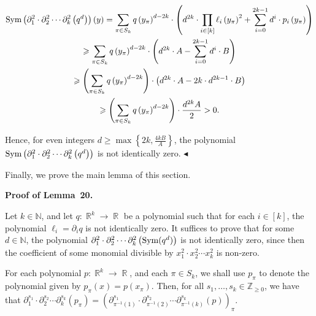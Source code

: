 \documentclass[10pt,a4paper]{article}
\begin{document}
\[\begin{gathered}
\displaystyle\textnormal{Sym}\left(\partial_{1}^{2}\cdot\partial_{2}^{2}\cdots\partial_{k}^{2}\left(q^{d}\right)\right)(y) \displaystyle=\sum_{\pi\in S_{k}}q\left(y_{\pi}\right)^{d-2k}\cdot\left(d^{2k}\cdot\prod_{i\in[k]}\ell_{i}\left(y_{\pi}\right)^{2}+\sum_{i=0}^{2k-1}d^{i}\cdot p_{i}\left(y_{\pi}\right)\right) \\
\displaystyle\geqslant\sum_{\pi\in S_{k}}q\left(y_{\pi}\right)^{d-2k}\cdot\left(d^{2k}\cdot A-\sum_{i=0}^{2k-1}d^{i}\cdot B\right) \\
\displaystyle\geqslant\left(\sum_{\pi\in S_{k}}q\left(y_{\pi}\right)^{d-2k}\right)\cdot\left(d^{2k}\cdot A-2k\cdot d^{2k-1}\cdot B\right) \\
\displaystyle\geqslant\left(\sum_{\pi\in S_{k}}q\left(y_{\pi}\right)^{d-2k}\right)\cdot\frac{d^{2k}A}{2}>0.
\end{gathered}\]


Hence, for even integers $d\geqslant\max\left\{2k,\frac{4kB}{A}\right\}$, the polynomial $\textnormal{Sym}\left(\partial_{1}^{2}\cdot\partial_{2}^{2}\cdots\partial_{k}^{2}\left(q^{d}\right)\right)$ is not identically zero.
$\blacktriangleleft$\par




Finally, we prove the main lemma of this section.\par





\par\medskip\noindent\textbf{Proof of Lemma 20.}\par




Let $k\in\mathbb{N}$, and let $q:\mathop{\mathbb{R}}^{k}\to\mathop{\mathbb{R}}$ be a polynomial such that for each $i\in[k]$, the polynomial $\ell_{i}=\partial_{i}q$ is not identically zero.
It suffices to prove that for some $d\in\mathbb{N}$, the polynomial $\partial_{1}^{2}\cdot\partial_{2}^{2}\cdots\partial_{k}^{2}\left(\textnormal{Sym}(q^{d})\right)$ is not identically zero, since then the coefficient of some monomial divisible by $x_{1}^{2}\cdot x_{2}^{2}\cdots x_{k}^{2}$ is non-zero.\par




For each polynomial $p:\mathop{\mathbb{R}}^{k}\to\mathop{\mathbb{R}}$, and each $\pi\in S_{k}$, we shall use $p_{\pi}$ to denote the polynomial given by $p_{\pi}(x)=p(x_{\pi})$.
Then, for all $s_{1},\dots,s_{k}\in\mathbb{Z}_{\geqslant 0}$, we have that $\partial_{1}^{s_{1}}\cdot\partial_{2}^{s_{2}}\cdots\partial_{k}^{s_{k}}\left(p_{\pi}\right)=\left(\partial_{\pi^{-1}(1)}^{s_{1}}\cdot\partial_{\pi^{-1}(2)}^{s_{2}}\cdots\partial_{\pi^{-1}(k)}^{s_{k}}\left(p\right)\right)_{\pi}$.\par
\end{document}
